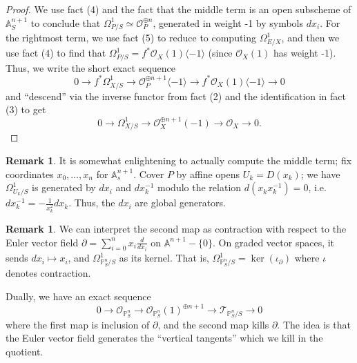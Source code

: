 \documentclass[10pt]{article}
\theoremstyle{definition}
\newtheorem{rmk}[thm]{Remark}
\DeclareMathOperator{\Spec}{Spec}
\newcommand{\PP}{\mathbb{P}}
\newcommand{\OO}{\mathcal{O}}
\begin{document}
\begin{proof}

We use fact (4) and the fact that the middle term is an open subscheme of $\mathbb{A}^{n+1}_S$ to conclude that $\Omega^1_{P/S} \simeq \OO_P^{\oplus n}$, generated in weight -1 by symbols $dx_i$.  For the rightmost term, we use fact (5) to reduce to computing $\Omega^1_{E/X}$, and then we use fact (4) to find that $\Omega^1_{P/S} = f^* \OO_X(1)\langle -1 \rangle$ (since $\OO_X(1)$ has weight -1).  Thus, we write the short exact sequence
$$0 \rightarrow f^* \Omega^1_{X/S} \rightarrow \OO_{P}^{\oplus n+1}\langle -1 \rangle \rightarrow f^* \OO_X(1)\langle -1 \rangle \rightarrow 0$$
and ``descend'' via the inverse functor from fact (2) and the identification in fact (3) to get
$$0 \rightarrow \Omega^1_{X/S} \rightarrow \OO_{X}^{\oplus n+1}(-1) \rightarrow \OO_{X} \rightarrow 0.$$
\end{proof}

\begin{rmk}
It is somewhat enlightening to actually compute the middle term; fix coordinates $x_0, \ldots, x_n$ for $\mathbb{A}^{n+1}_s$.  Cover $P$ by affine opens $U_k = D(x_k)$; we have $\Omega^1_{U_k/S}$ is generated by $dx_i$ and $dx_k^{-1}$ modulo the relation $d(x_k x_k^{-1}) = 0$, i.e. $dx_k^{-1} = - \frac{1}{x_k^2} dx_k$.  Thus, the $dx_i$ are global generators.
\end{rmk}

\begin{rmk}
We can interpret the second map as contraction with respect to the Euler vector field $\partial = \sum_{i=0}^n x_i \frac{d}{dx_i}$ on $\mathbb{A}^{n+1} - \{0\}$.  On graded vector spaces, it sends $dx_i \mapsto x_i$, and $\Omega^1_{\PP^n_S/S}$ as its kernel.  That is, $\Omega^1_{\PP^n_S/S} = \ker(\iota_\partial)$ where $\iota$ denotes contraction.

Dually, we have an exact sequence
$$0 \rightarrow \OO_{\PP^n_S} \rightarrow \OO_{\PP^n_S}(1)^{\oplus n+1} \rightarrow \mathcal{T}_{\PP^n_S/S} \rightarrow 0$$
where the first map is inclusion of $\partial$, and the second map kills $\partial$.  The idea is that the Euler vector field generates the ``vertical tangents'' which we kill in the quotient.
\end{rmk}
\end{document}
